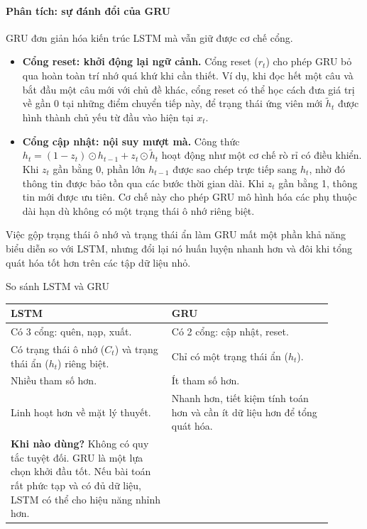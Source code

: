\paragraph{Phân tích: sự đánh đổi của GRU}
GRU đơn giản hóa kiến trúc LSTM mà vẫn giữ được cơ chế cổng.
\begin{itemize}
    \item \textbf{Cổng reset: khởi động lại ngữ cảnh.} Cổng reset ($r_t$) cho phép GRU bỏ qua hoàn toàn trí nhớ quá khứ khi cần thiết. Ví dụ, khi đọc hết một câu và bắt đầu một câu mới với chủ đề khác, cổng reset có thể học cách đưa giá trị về gần 0 tại những điểm chuyển tiếp này, để trạng thái ứng viên mới $\tilde{h}_t$ được hình thành chủ yếu từ đầu vào hiện tại $x_t$.

    \item \textbf{Cổng cập nhật: nội suy mượt mà.} Công thức $h_t = (1 - z_t) \odot h_{t-1} + z_t \odot \tilde{h}_t$ hoạt động như một cơ chế rò rỉ có điều khiển. Khi $z_t$ gần bằng 0, phần lớn $h_{t-1}$ được sao chép trực tiếp sang $h_t$, nhờ đó thông tin được bảo tồn qua các bước thời gian dài. Khi $z_t$ gần bằng 1, thông tin mới được ưu tiên. Cơ chế này cho phép GRU mô hình hóa các phụ thuộc dài hạn dù không có một trạng thái ô nhớ riêng biệt.
\end{itemize}
Việc gộp trạng thái ô nhớ và trạng thái ẩn làm GRU mất một phần khả năng biểu diễn so với LSTM, nhưng đổi lại nó huấn luyện nhanh hơn và đôi khi tổng quát hóa tốt hơn trên các tập dữ liệu nhỏ.
\begin{assess}{So sánh LSTM và GRU}
\begin{tabular}{p{0.45\linewidth} | p{0.45\linewidth}}
    \textbf{LSTM} & \textbf{GRU} \\
    \hline
    Có 3 cổng: quên, nạp, xuất. & Có 2 cổng: cập nhật, reset. \\
    \hline
    Có trạng thái ô nhớ ($C_t$) và trạng thái ẩn ($h_t$) riêng biệt. & Chỉ có một trạng thái ẩn ($h_t$). \\
    \hline
    Nhiều tham số hơn. & Ít tham số hơn. \\
    \hline
    Linh hoạt hơn về mặt lý thuyết. & Nhanh hơn, tiết kiệm tính toán hơn và cần ít dữ liệu hơn để tổng quát hóa. \\
    \hline
    \textbf{Khi nào dùng?} Không có quy tắc tuyệt đối. GRU là một lựa chọn khởi đầu tốt. Nếu bài toán rất phức tạp và có đủ dữ liệu, LSTM có thể cho hiệu năng nhỉnh hơn.
\end{tabular}
\end{assess}